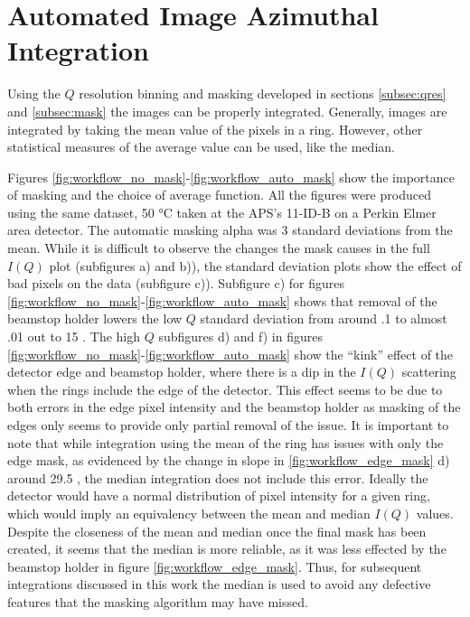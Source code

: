 \section{Automated Image Azimuthal Integration} \label{subsec:int}
Using the $Q$ resolution binning and masking developed in sections \ref{subsec:qres} and \ref{subsec:mask} the images can be properly integrated.
Generally, images are integrated by taking the mean value of the pixels in a ring.
However, other statistical measures of the average value can be used, like the median.

Figures \ref{fig:workflow_no_mask}-\ref{fig:workflow_auto_mask} show the importance of masking and the choice of average function.
All the figures were produced using the same dataset, 50 \si{\degree}C  taken at the APS's 11-ID-B on a Perkin Elmer area detector.
The automatic masking alpha was $3$ standard deviations from the mean.
While it is difficult to observe the changes the mask causes in the full $I(Q)$ plot (subfigures a) and b)), the standard deviation plots show the effect of bad pixels on the data (subfigure c)).
Subfigure c) for figures \ref{fig:workflow_no_mask}-\ref{fig:workflow_auto_mask} shows that removal of the beamstop holder lowers the low $Q$ standard deviation from around .1 to almost .01 out to 15 \iA.
The high $Q$ subfigures d) and f) in figures \ref{fig:workflow_no_mask}-\ref{fig:workflow_auto_mask} show the ``kink'' effect of the detector edge and beamstop holder, where there is a dip in the $I(Q)$ scattering when the rings include the edge of the detector.
This effect seems to be due to both errors in the edge pixel intensity and the beamstop holder as masking of the edges only seems to provide only partial removal of the issue.
It is important to note that while integration using the mean of the ring has issues with only the edge mask, as evidenced by the change in slope in \ref{fig:workflow_edge_mask} d) around 29.5 \iA, the median integration does not include this error.
Ideally the detector would have a normal distribution of pixel intensity for a given ring, which would imply an equivalency between the mean and median $I(Q)$ values.
Despite the closeness of the mean and median once the final mask has been created, it seems that the median is more reliable, as it was less effected by the beamstop holder in figure \ref{fig:workflow_edge_mask}.
Thus, for subsequent integrations discussed in this work the median is used to avoid any defective features that the masking algorithm may have missed.

